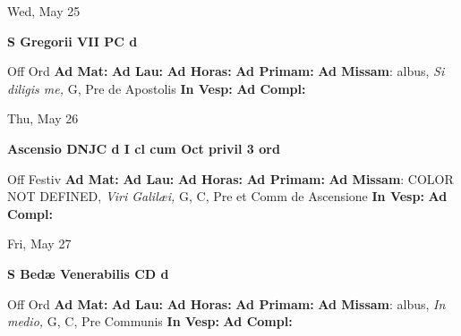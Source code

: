 \documentclass[10pt]{memoir}
\begin{document}
\begin{center}
\begin{minipage}{3.5in}
\vspace{2em}
\begin{center}Wed, May 25
\end{center}
\textbf{ \large S Gregorii VII PC
\textnormal{\normalsize d}}

\begin{justify}Off Ord
\textbf{Ad Mat: }
\textbf{Ad Lau: }
\textbf{Ad Horas: }
\textbf{Ad Primam: }\textbf{Ad Missam}: albus, \textit{Si diligis me,} G, Pre de Apostolis
\textbf{In Vesp: }
\textbf{Ad Compl: }
\end{justify}
\end{minipage}
\end{center}

\begin{center}
\begin{minipage}{3.5in}
\vspace{2em}
\begin{center}Thu, May 26
\end{center}
\textbf{ \large Ascensio DNJC
\textnormal{\normalsize d I cl cum Oct privil 3 ord}}

\begin{justify}Off Festiv
\textbf{Ad Mat: }
\textbf{Ad Lau: }
\textbf{Ad Horas: }
\textbf{Ad Primam: }\textbf{Ad Missam}: COLOR NOT DEFINED, \textit{Viri Galilæi,} G, C, Pre et Comm de Ascensione
\textbf{In Vesp: }
\textbf{Ad Compl: }
\end{justify}
\end{minipage}
\end{center}

\begin{center}
\begin{minipage}{3.5in}
\vspace{2em}
\begin{center}Fri, May 27
\end{center}
\textbf{ \large S Bedæ Venerabilis CD
\textnormal{\normalsize d}}

\begin{justify}Off Ord
\textbf{Ad Mat: }
\textbf{Ad Lau: }
\textbf{Ad Horas: }
\textbf{Ad Primam: }\textbf{Ad Missam}: albus, \textit{In medio,} G, C, Pre Communis
\textbf{In Vesp: }
\textbf{Ad Compl: }
\end{justify}
\end{minipage}
\end{center}
\end{document}
